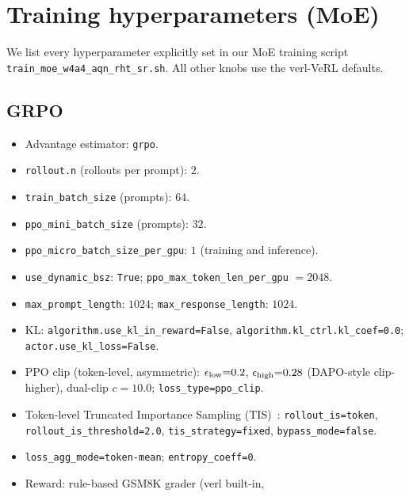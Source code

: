 \section{Training hyperparameters (MoE)}
\label{app:hyperparams}

We list every hyperparameter explicitly set in our MoE training script
\texttt{train\_moe\_w4a4\_aqn\_rht\_sr.sh}. All other knobs use the
verl-VeRL defaults.

\subsection*{GRPO}

\begin{itemize}\setlength{\itemsep}{1pt}
  \item Advantage estimator: \texttt{grpo}.
  \item \texttt{rollout.n} (rollouts per prompt): $2$.
  \item \texttt{train\_batch\_size} (prompts): $64$.
  \item \texttt{ppo\_mini\_batch\_size} (prompts): $32$.
  \item \texttt{ppo\_micro\_batch\_size\_per\_gpu}: $1$ (training and inference).
  \item \texttt{use\_dynamic\_bsz}: \texttt{True};
        \texttt{ppo\_max\_token\_len\_per\_gpu} $= 2048$.
  \item \texttt{max\_prompt\_length}: $1024$;
        \texttt{max\_response\_length}: $1024$.
  \item KL: \texttt{algorithm.use\_kl\_in\_reward=False},
        \texttt{algorithm.kl\_ctrl.kl\_coef=0.0};
        \texttt{actor.use\_kl\_loss=False}.
  \item PPO clip (token-level, asymmetric):
        $\epsilon_{\rm low}{=}0.2$,
        $\epsilon_{\rm high}{=}0.28$ (DAPO-style clip-higher),
        dual-clip $c{=}10.0$;
        \texttt{loss\_type=ppo\_clip}.
  \item Token-level Truncated Importance Sampling
        (TIS)~\citep{yao2025tis}:
        \texttt{rollout\_is=token},
        \texttt{rollout\_is\_threshold=2.0},
        \texttt{tis\_strategy=fixed},
        \texttt{bypass\_mode=false}.
  \item \texttt{loss\_agg\_mode=token-mean};
        \texttt{entropy\_coeff=0}.
  \item Reward: rule-based GSM8K grader (verl built-in,

\end{itemize}
